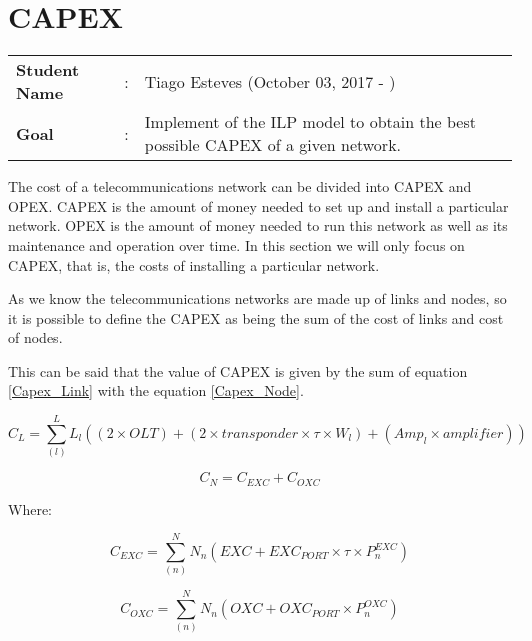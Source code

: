 \clearpage

\section{CAPEX}
\begin{tcolorbox}	
\begin{tabular}{p{2.75cm} p{0.2cm} p{10.5cm}} 	
\textbf{Student Name}  &:& Tiago Esteves    (October 03, 2017 - )\\
\textbf{Goal}          &:& Implement of the ILP model to obtain the best possible CAPEX of a given network.
\end{tabular}
\end{tcolorbox}
\vspace{11pt}

The cost of a telecommunications network can be divided into CAPEX and OPEX.
CAPEX is the amount of money needed to set up and install a particular network.
OPEX is the amount of money needed to run this network as well as its maintenance and operation over time.
In this section we will only focus on CAPEX, that is, the costs of installing a particular network.

As we know the telecommunications networks are made up of links and nodes, so it is possible to define the CAPEX as being the sum of the cost of links and cost of nodes.

This can be said that the value of CAPEX is given by the sum of equation \ref{Capex_Link} with the equation \ref{Capex_Node}.

\begin{equation}
C_L = \sum_{(l)}^L L_{l} \left( (2 \times OLT) + (2 \times transponder \times \tau \times W_{l}) +  (Amp_{l} \times amplifier) \right)
\label{Capex_Link}
\end{equation}

\begin{equation}
C_N = C_{EXC} + C_{OXC}
\label{Capex_Node}
\end{equation}

Where:

\begin{equation}
C_{EXC} = \sum_{(n)}^N N_{n} \left(EXC + EXC_{PORT} \times \tau \times P^{EXC}_{n} \right)
\label{Capex_Node_EXC}
\end{equation}

\begin{equation}
C_{OXC} = \sum_{(n)}^N N_{n} \left(OXC + OXC_{PORT} \times P^{OXC}_{n} \right)
\label{Capex_Node_OXC}
\end{equation}


